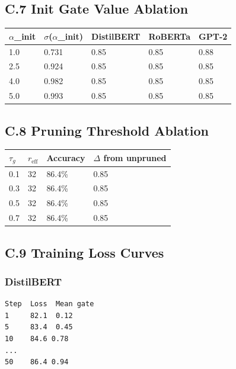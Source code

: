 \subsection{C.7 Init Gate Value Ablation}

\begin{table}[H]
\centering
\small
\begin{tabular}{lllll}
\toprule
\textbf{$\alpha$\_init} & \textbf{$\sigma$($\alpha$\_init)} & \textbf{DistilBERT} & \textbf{RoBERTa} & \textbf{GPT-2} \\
\midrule
1.0 & 0.731 & 0.85 & 0.85 & 0.88 \\
2.5 & 0.924 & 0.85 & 0.85 & 0.85 \\
4.0 & 0.982 & 0.85 & 0.85 & 0.85 \\
5.0 & 0.993 & 0.85 & 0.85 & 0.85 \\
\bottomrule
\end{tabular}
\end{table}

\subsection{C.8 Pruning Threshold Ablation}

\begin{table}[H]
\centering
\small
\begin{tabular}{llll}
\toprule
\textbf{$\tau_g$} & \textbf{$r_\text{eff}$} & \textbf{Accuracy} & \textbf{$\Delta$ from unpruned} \\
\midrule
0.1 & 32 & 86.4\% & 0.85 \\
0.3 & 32 & 86.4\% & 0.85 \\
0.5 & 32 & 86.4\% & 0.85 \\
0.7 & 32 & 86.4\% & 0.85 \\
\bottomrule
\end{tabular}
\end{table}

\subsection{C.9 Training Loss Curves}

\subsubsection{DistilBERT}
\begin{lstlisting}
Step  Loss  Mean gate
1     82.1  0.12
5     83.4  0.45
10    84.6 0.78
...
50    86.4 0.94
\end{lstlisting}


